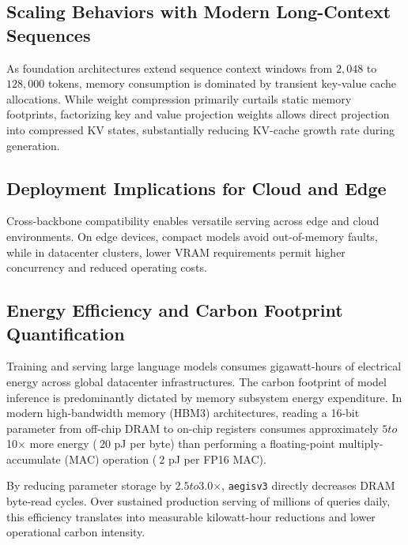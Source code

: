 \subsection{Scaling Behaviors with Modern Long-Context Sequences}
As foundation architectures extend sequence context windows from $2{,}048$ to $128{,}000$ tokens, memory consumption is dominated by transient key-value cache allocations. While weight compression primarily curtails static memory footprints, factorizing key and value projection weights allows direct projection into compressed KV states, substantially reducing KV-cache growth rate during generation.

\subsection{Deployment Implications for Cloud and Edge}
Cross-backbone compatibility enables versatile serving across edge and cloud environments. On edge devices, compact models avoid out-of-memory faults, while in datacenter clusters, lower VRAM requirements permit higher concurrency and reduced operating costs.

\subsection{Energy Efficiency and Carbon Footprint Quantification}
Training and serving large language models consumes gigawatt-hours of electrical energy across global datacenter infrastructures. The carbon footprint of model inference is predominantly dictated by memory subsystem energy expenditure. In modern high-bandwidth memory (HBM3) architectures, reading a 16-bit parameter from off-chip DRAM to on-chip registers consumes approximately $5$\times$ to $10$\times$ more energy ($~20$ pJ per byte) than performing a floating-point multiply-accumulate (MAC) operation ($~2$ pJ per FP16 MAC).

By reducing parameter storage by $2.5$\times$ to $3.0$\times$, \texttt{aegisv3} directly decreases DRAM byte-read cycles. Over sustained production serving of millions of queries daily, this efficiency translates into measurable kilowatt-hour reductions and lower operational carbon intensity.
